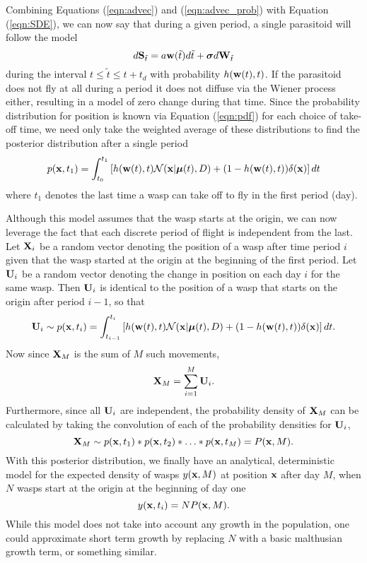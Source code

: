 \documentclass[12pt,english]{article}
\begin{document}
Combining Equations (\ref{eqn:advec}) and (\ref{eqn:advec_prob}) with Equation (\ref{eqn:SDE}), we can now say that during a given period, a single parasitoid will follow the model
\begin{equation*}
d\mathbf{S}_{\tilde{t}} = a\mathbf{w}(\tilde{t})d\tilde{t} + \boldsymbol\sigma d\mathbf{W}_{\tilde{t}}
\end{equation*}
during the interval $t\leq\tilde{t}\leq t+t_d$ with probability $h(\mathbf{w}(t),t)$. If the parasitoid does not fly at all during a period it does not diffuse via the Wiener process either, resulting in a model of zero change during that time. Since the probability distribution for position is known via Equation (\ref{eqn:pdf}) for each choice of take-off time, we need only take the weighted average of these distributions to find the posterior distribution after a single period
\begin{equation}
p(\mathbf{x},t_1) = \int_{t_0}^{t_1}\left[h(\mathbf{w}(t),t)\mathcal{N}(\mathbf{x}|\boldsymbol\mu(t),D) + (1 - h(\mathbf{w}(t),t))\delta(\mathbf{x})\right]dt\label{eqn:first_post}
\end{equation}
where $t_1$ denotes the last time a wasp can take off to fly in the first period (day).

Although this model assumes that the wasp starts at the origin, we can now leverage the fact that each discrete period of flight is independent from the last. Let $\mathbf{X}_i$ be a random vector denoting the position of a wasp after time period $i$ given that the wasp started at the origin at the beginning of the first period. Let $\mathbf{U}_i$ be a random vector denoting the change in position on each day $i$ for the same wasp. Then $\mathbf{U}_i$ is identical to the position of a wasp that starts on the origin after period $i-1$, so that
\begin{equation}
\mathbf{U}_i \sim p(\mathbf{x},t_i) = \int_{t_{i-1}}^{t_i}\left[h(\mathbf{w}(t),t)\mathcal{N}(\mathbf{x}|\boldsymbol\mu(t),D) + (1 - h(\mathbf{w}(t),t))\delta(\mathbf{x})\right]dt.
\end{equation}
Now since $\mathbf{X}_M$ is the sum of $M$ such movements,
\begin{equation*}
\mathbf{X}_M = \sum_{i=1}^M \mathbf{U}_i.
\end{equation*}
Furthermore, since all $\mathbf{U}_i$ are independent, the probability density of $\mathbf{X}_M$ can be calculated by taking the convolution of each of the probability densities for $\mathbf{U}_i$,
\begin{equation}
\mathbf{X}_M \sim p(\mathbf{x},t_1)\ast p(\mathbf{x},t_2)\ast\ldots\ast p(\mathbf{x},t_M) = P(\mathbf{x},M).
\end{equation}
With this posterior distribution, we finally have an analytical, deterministic model for the expected density of wasps $y(\mathbf{x},M)$ at position $\mathbf{x}$ after day $M$, when $N$ wasps start at the origin at the beginning of day one
\begin{equation*}
y(\mathbf{x},t_i) = NP(\mathbf{x},M).
\end{equation*}
While this model does not take into account any growth in the population, one could approximate short term growth by replacing $N$ with a basic malthusian growth term, or something similar.
\end{document}

